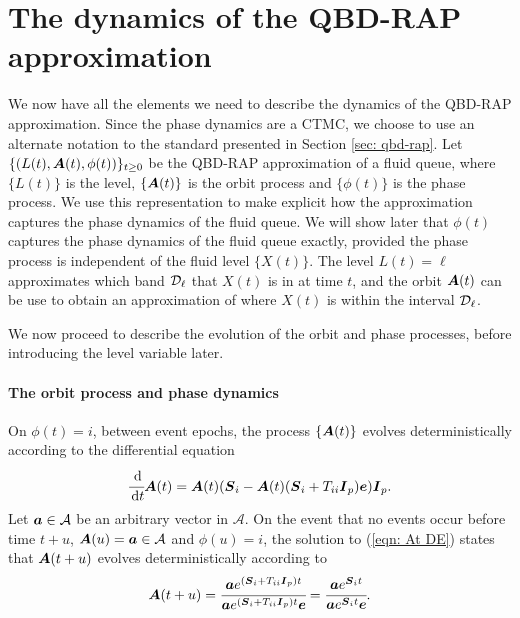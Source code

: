 \section{The dynamics of the QBD-RAP approximation}\label{sec: dynamics}
We now have all the elements we need to describe the dynamics of the QBD-RAP approximation. Since the phase dynamics are a CTMC, we choose to use an alternate notation to the standard presented in Section \ref{sec: qbd-rap}. Let \(\{(L(t),\boldsymbol A(t),\phi(t))\}_{t\geq0}\) be the QBD-RAP approximation of a fluid queue, where \(\{L(t)\}\) is the level, \(\{\boldsymbol A(t)\}\) is the orbit process and \(\{\phi(t)\}\) is the phase process. We use this representation to make explicit how the approximation captures the phase dynamics of the fluid queue. We will show later that \(\phi(t)\) captures the phase dynamics of the fluid queue exactly, provided the phase process is independent of the fluid level \(\{X(t)\}\). The level \(L(t)=\ell\) approximates which band \(\mathcal{D}_\ell\) that \(X(t)\) is in at time \(t\), and the orbit \(\boldsymbol A(t)\) can be use to obtain an approximation of where \(X(t)\) is within the interval \(\mathcal{D}_\ell\). 

We now proceed to describe the evolution of the orbit and phase processes, before introducing the level variable later. 

\paragraph{The orbit process and phase dynamics} On \({\phi}(t)=i\), between event epochs, the process \(\{\boldsymbol A(t)\}\) evolves deterministically according to the differential equation 
\begin{align}\label{eqn: At DE}
\cfrac{\, \mathrm{d}}{\, \mathrm{d} t}\boldsymbol A(t) = \boldsymbol A(t)(\boldsymbol{S}_i - \boldsymbol A(t) (\boldsymbol{S}_i + T_{ii}\boldsymbol{I}_p)\boldsymbol e)\boldsymbol{I}_p.
\end{align}
Let \(\boldsymbol a \in \mathcal A\) be an arbitrary vector in \(\mathcal A\). On the event that no events occur before time \(t+u\), \(\boldsymbol A(u) = \boldsymbol a\in\mathcal A\) and \({\phi}(u)=i\), the solution to (\ref{eqn: At DE}) states that \(\boldsymbol A({t+u})\) evolves deterministically according to 
\[\boldsymbol A({t+u}) =  \cfrac{\boldsymbol a e^{(\boldsymbol{S}_i+T_{ii}\boldsymbol{I}_p)t}}{\boldsymbol a e^{(\boldsymbol{S}_i+T_{ii}\boldsymbol{I}_p)t} \boldsymbol e} = \cfrac{\boldsymbol a e^{\boldsymbol{S}_i t}}{\boldsymbol a e^{\boldsymbol{S}_i t} \boldsymbol e}.\] 

